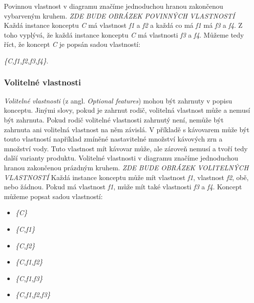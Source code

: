 Povinnou vlastnost v diagramu značíme jednoduchou hranou zakončenou vybarveným kruhem.
\newline
\newline
\textit{ZDE BUDE OBRÁZEK POVINNÝCH VLASTNOSTÍ}
\newline
\newline
Každá instance konceptu \textit{C} má vlastnost \textit{f1} a \textit{f2} a každá co má \textit{f1} má \textit{f3} a \textit{f4}. Z toho vyplývá, že každá instance konceptu \textit{C} má vlastnosti \textit{f3} a \textit{f4}. Můžeme tedy říct, že koncept \textit{C} je popsán sadou vlastností:

\textit{\{C,f1,f2,f3,f4\}}.


\subsubsection{Volitelné vlastnosti}
\textit{Volitelné vlastnosti} (z angl. \textit{Optional features}) mohou být zahrnuty v popisu konceptu. Jinými slovy, pokud je zahrnut rodič, volitelná vlastnost může a nemusí být zahrnuta. Pokud rodič volitelné vlastnosti zahrnutý není, nemůže být zahrnuta ani volitelná vlastnost na něm závislá. V příkladě s kávovarem může být touto vlastností například zmíněné nastavitelné množství kávových zrn a množství vody. Tuto vlastnost mít kávovar může, ale zároveň nemusí a tvoří tedy další varianty produktu.
Volitelné vlastnosti v diagramu značíme jednoduchou hranou zakončenou prázdným kruhem.
\newline
\newline
\textit{ZDE BUDE OBRÁZEK VOLITELNÝCH VLASTNOSTÍ}
\newline
\newline
Každá instance konceptu může mít vlastnost \textit{f1}, vlastnost \textit{f2}, obě, nebo žádnou. Pokud má vlastnost \textit{f1}, může mít také vlastnosti \textit{f3} a \textit{f4}. Koncept můžeme popsat sadou vlastností: 
\begin{itemize}
	\item \textit{\{C\}}
	\item \textit{\{C,f1\}}
	\item \textit{\{C,f2\}}
	\item \textit{\{C,f1,f2\}}
	\item \textit{\{C,f1,f3\}}
	\item \textit{\{C,f1,f2,f3\}}
\end{itemize}


